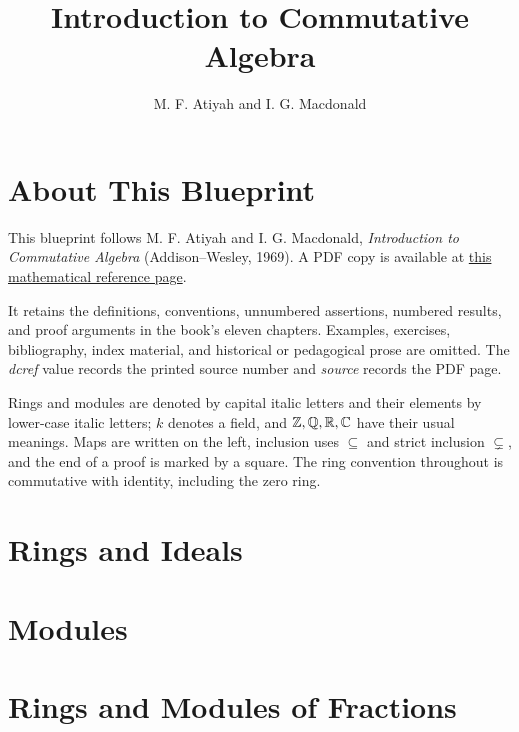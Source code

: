 

\title{Introduction to Commutative Algebra}
\author{M. F. Atiyah and I. G. Macdonald}
\date{}
\maketitle

\chapter*{About This Blueprint}
\label{am-about}
This blueprint follows M. F. Atiyah and I. G. Macdonald, \emph{Introduction to
Commutative Algebra} (Addison--Wesley, 1969).  A PDF copy is available at
\href{https://www.math.ens.psl.eu/~benoist/refs/AtiyahMacDonald.pdf}{this
mathematical reference page}.

It retains the definitions, conventions, unnumbered assertions, numbered
results, and proof arguments in the book's eleven chapters.  Examples,
exercises, bibliography, index material, and historical or pedagogical prose
are omitted.  The \emph{dcref} value records the printed source number and
\emph{source} records the PDF page.

\begin{notation}
\label{am-notation}
\uses{}
Rings and modules are denoted by capital italic letters and their elements by
lower-case italic letters; $k$ denotes a field, and $\mathbb Z,\mathbb Q,\mathbb R,\mathbb C$ have their
usual meanings.  Maps are written on the left, inclusion uses $\subseteq$ and
strict inclusion $\subsetneq$, and the end of a proof is marked by a square.
The ring convention throughout is commutative with identity, including the
zero ring.
\end{notation}

\tableofcontents

\chapter{Rings and Ideals}
\label{am-ch1}

\chapter{Modules}
\label{am-ch2}

\chapter{Rings and Modules of Fractions}
\label{am-ch3}

